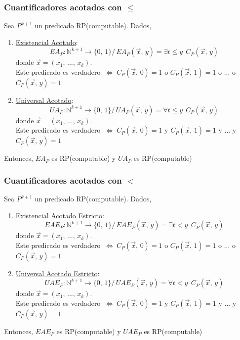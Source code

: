 \documentclass{article}
\newcommand{\comma}{,\,}                                %
\newcommand{\tq}{/\,}                                   %
\newcommand{\naturales}{\mathbb{N}}                     %
\newcommand{\Leftrightarrows}{\: \Leftrightarrow \:}    %
\begin{document}
\subsubsection{Cuantificadores acotados con $\leq$}
Sea $P^{k+1}$ un predicado RP(computable). Dados,
\begin{enumerate}
    \item \underline{Existencial Acotado}:
    \begin{equation*}
        EA_P: \naturales^{k+1} \rightarrow \{0 \comma 1\} \tq EA_P(\Vec{x} \comma y) = \exists t \leq y \:\: C_P(\Vec{x} \comma y) 
    \end{equation*}
    donde $\Vec{x} = (x_1 \comma ... \comma x_k)$.
    \\Este predicado es verdadero $\Leftrightarrows C_P(\Vec{x} \comma 0) = 1$ o $C_P(\Vec{x} \comma 1) = 1$ o ... o $C_P(\Vec{x} \comma y) = 1$
    \item \underline{Universal Acotado}:
    \begin{equation*}
        UA_P: \naturales^{k+1} \rightarrow \{0 \comma 1\} \tq UA_P(\Vec{x} \comma y) = \forall t \leq y \:\: C_P(\Vec{x} \comma y) 
    \end{equation*}
    donde $\Vec{x} = (x_1 \comma ... \comma x_k)$.
    \\Este predicado es verdadero $\Leftrightarrows C_P(\Vec{x} \comma 0) = 1$ y $C_P(\Vec{x} \comma 1) = 1$ y ... y $C_P(\Vec{x} \comma y) = 1$
\end{enumerate}
Entonces, $EA_P$ es RP(computable) y $UA_P$ es RP(computable)

\subsubsection{Cuantificadores acotados con $<$}
Sea $P^{k+1}$ un predicado RP(computable). Dados,
\begin{enumerate}
    \item \underline{Existencial Acotado Estricto}:
    \begin{equation*}
        EAE_P: \naturales^{k+1} \rightarrow \{0 \comma 1\} \tq EAE_P(\Vec{x} \comma y) = \exists t < y \:\: C_P(\Vec{x} \comma y) 
    \end{equation*}
    donde $\Vec{x} = (x_1 \comma ... \comma x_k)$.
    \\Este predicado es verdadero $\Leftrightarrows C_P(\Vec{x} \comma 0) = 1$ o $C_P(\Vec{x} \comma 1) = 1$ o ... o $C_P(\Vec{x} \comma y) = 1$
    \item \underline{Universal Acotado Estricto}:
    \begin{equation*}
        UAE_P: \naturales^{k+1} \rightarrow \{0 \comma 1\} \tq UAE_P(\Vec{x} \comma y) = \forall t < y \:\: C_P(\Vec{x} \comma y)
    \end{equation*}
    donde $\Vec{x} = (x_1 \comma ... \comma x_k)$.
    \\Este predicado es verdadero $\Leftrightarrows C_P(\Vec{x} \comma 0) = 1$ y $C_P(\Vec{x} \comma 1) = 1$ y ... y $C_P(\Vec{x} \comma y) = 1$
\end{enumerate}
Entonces, $EAE_P$ es RP(computable) y $UAE_P$ es RP(computable)
\end{document}
